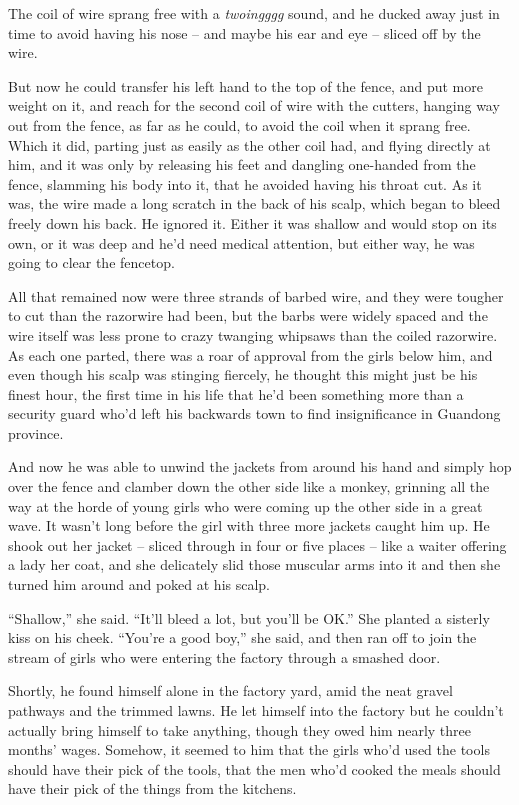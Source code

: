 The coil of wire sprang free with a \emph{twoingggg} sound, and he
ducked away just in time to avoid having his nose -- and maybe his
ear and eye -- sliced off by the wire.

But now he could transfer his left hand to the top of the fence,
and put more weight on it, and reach for the second coil of wire
with the cutters, hanging way out from the fence, as far as he
could, to avoid the coil when it sprang free. Which it did, parting
just as easily as the other coil had, and flying directly at him,
and it was only by releasing his feet and dangling one-handed from
the fence, slamming his body into it, that he avoided having his
throat cut. As it was, the wire made a long scratch in the back of
his scalp, which began to bleed freely down his back. He ignored
it. Either it was shallow and would stop on its own, or it was deep
and he'd need medical attention, but either way, he was going to
clear the fencetop.

All that remained now were three strands of barbed wire, and they
were tougher to cut than the razorwire had been, but the barbs were
widely spaced and the wire itself was less prone to crazy twanging
whipsaws than the coiled razorwire. As each one parted, there was a
roar of approval from the girls below him, and even though his
scalp was stinging fiercely, he thought this might just be his
finest hour, the first time in his life that he'd been something
more than a security guard who'd left his backwards town to find
insignificance in Guandong province.

And now he was able to unwind the jackets from around his hand and
simply hop over the fence and clamber down the other side like a
monkey, grinning all the way at the horde of young girls who were
coming up the other side in a great wave. It wasn't long before the
girl with three more jackets caught him up. He shook out her jacket
-- sliced through in four or five places -- like a waiter offering
a lady her coat, and she delicately slid those muscular arms into
it and then she turned him around and poked at his scalp.

``Shallow,'' she said. ``It'll bleed a lot, but you'll be OK.'' She
planted a sisterly kiss on his cheek. ``You're a good boy,'' she
said, and then ran off to join the stream of girls who were
entering the factory through a smashed door.

Shortly, he found himself alone in the factory yard, amid the neat
gravel pathways and the trimmed lawns. He let himself into the
factory but he couldn't actually bring himself to take anything,
though they owed him nearly three months' wages. Somehow, it seemed
to him that the girls who'd used the tools should have their pick
of the tools, that the men who'd cooked the meals should have their
pick of the things from the kitchens.

